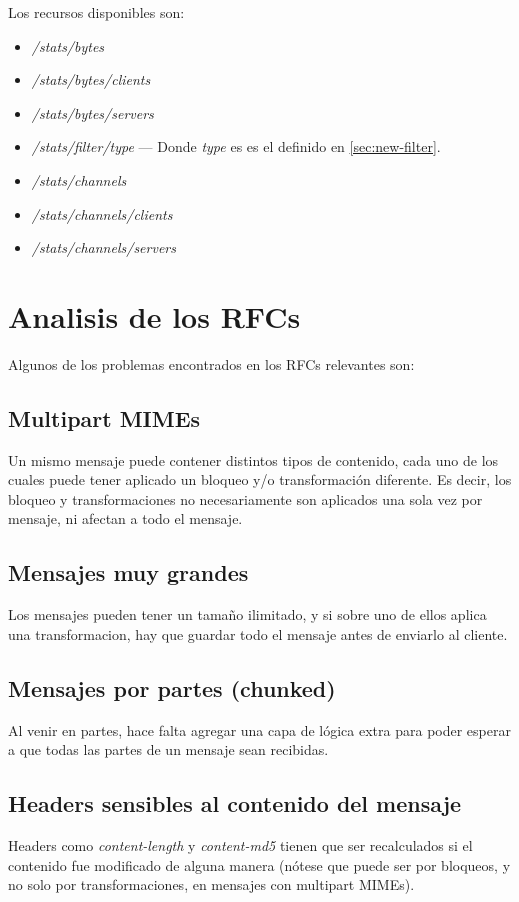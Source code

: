 \documentclass[11pt,a4paper,titlepage]{article}
\begin{document}
Los recursos disponibles son:
\begin{itemize}
    \item \textit{/stats/bytes}
    \item \textit{/stats/bytes/clients}
    \item \textit{/stats/bytes/servers}
    \item \textit{/stats/filter/type} --- Donde \textit{type} es es el definido en \ref{sec:new-filter}.
    \item \textit{/stats/channels}
    \item \textit{/stats/channels/clients}
    \item \textit{/stats/channels/servers}
\end{itemize}

\section{Analisis de los RFCs}
Algunos de los problemas encontrados en los RFCs relevantes son:

\subsection{Multipart MIMEs}
Un mismo mensaje puede contener distintos tipos de contenido, cada uno de los cuales
puede tener aplicado un bloqueo y/o transformación diferente. Es decir, los bloqueo y transformaciones
no necesariamente son aplicados una sola vez por mensaje, ni afectan a todo el mensaje.

\subsection{Mensajes muy grandes}
Los mensajes pueden tener un tamaño ilimitado, y si sobre uno de ellos aplica una transformacion,
hay que guardar todo el mensaje antes de enviarlo al cliente.

\subsection{Mensajes por partes (chunked)}
Al venir en partes, hace falta agregar una capa de lógica extra para poder esperar a que todas las
partes de un mensaje sean recibidas.

\subsection{Headers sensibles al contenido del mensaje}
Headers como \textit{content-length} y \textit{content-md5} tienen que ser recalculados si el contenido fue modificado
de alguna manera (nótese que puede ser por bloqueos, y no solo por transformaciones, en mensajes con multipart MIMEs).
\end{document}

